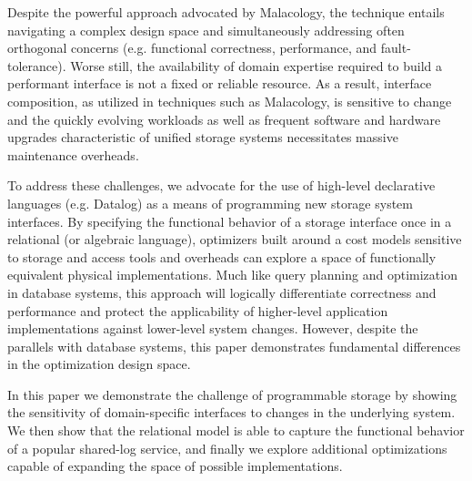 Despite the powerful approach advocated by Malacology, the technique entails navigating 
a complex design space and simultaneously addressing often orthogonal
concerns (e.g. functional correctness, performance, and fault-tolerance).
Worse still, the availability of domain expertise required to build a performant interface is not a fixed or reliable resource. 
As a result, interface composition, as utilized in techniques such as Malacology, is sensitive to
change and the quickly evolving workloads as well as
frequent software and hardware upgrades characteristic of unified storage systems
necessitates massive maintenance overheads.

To address these challenges, we advocate for the use of high-level declarative
languages (e.g. Datalog) as a means of programming new storage system interfaces. 
By specifying the functional behavior of a storage interface once
in a relational (or algebraic language), optimizers built around a cost models sensitive
to storage and access tools and overheads can explore a space of functionally equivalent
physical implementations. Much like query planning and optimization in database systems, this approach will
logically differentiate correctness and performance and protect the applicability of higher-level application implementations
against lower-level system changes. However, despite the parallels with database systems, this paper demonstrates fundamental differences in the optimization design space.

In this paper we demonstrate the challenge of programmable storage by showing
the sensitivity of domain-specific interfaces to changes in the underlying
system. We then show that the relational model is able to capture the
functional behavior of a popular shared-log service, and finally we explore
additional optimizations capable of expanding the space of
possible implementations.
